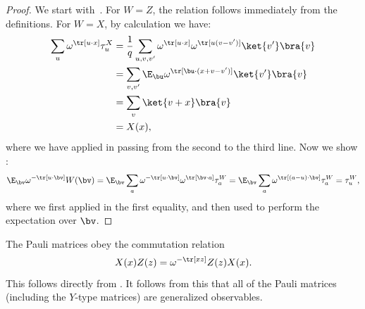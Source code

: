 \begin{proof}
  We start with~. For $W = Z$, the relation
  follows immediately from the definitions. For $W = X$, by
  calculation we have:
  \begin{align*}
    \sum_{u} \omega^{\tr[u \cdot x]} \tau^X_u &= \frac{1}{q} \sum_{u,
                                                v, v'} \omega^{\tr[u
                                                \cdot x]}
                                                \omega^{\tr[u(v -
                                                v')]} \ket{v'}\bra{v}
    \\
    &= \sum_{v, v'} \E_{\bu} \omega^{\tr[\bu \cdot (x + v - v')]}\ket{v'}\bra{v}\\
                                              &= \sum_{v} \ket{v+x}
                                                \bra{v} \\
                                              &= X(x),
  \end{align*}
  where we have applied  in passing from
  the second to the third line.
  Now we show :
  \begin{equation*}
    \E_{\bv} \omega^{-\tr[u\cdot \bv]} W(\bv) = \E_{\bv} \sum_{a}
                                         \omega^{-\tr[u \cdot \bv]}
                                         \omega^{\tr[\bv \cdot a]}
                                         \tau^W_{a}
                                         = \E_{\bv} \sum_{a}
                                         \omega^{\tr[(a - u) \cdot \bv]}
                                         \tau^W_{a}
                                       = \tau^W_{u},
  \end{equation*}
  where we first applied  in the first
  equality, and then used  to perform the
  expectation over $\bv$.
\end{proof}
The Pauli matrices obey the commutation
relation
\begin{equation}\label{eq:commutation-relations}
 X(x)Z(z) = \omega^{-\tr[xz]} Z(z)X(x).
 \end{equation}
This follows directly from . It follows from
this that all of the Pauli matrices (including the $Y$-type matrices)
are generalized observables.


